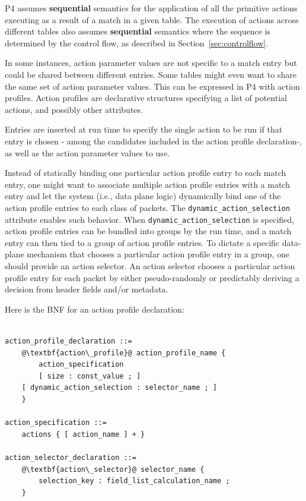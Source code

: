 \documentclass[12pt]{article}
\begin{document}
P4 assumes \textbf{sequential} semantics for the application of all the primitive actions 
executing as a result of a match in a given table. The execution of actions 
across different tables also assumes \textbf{sequential} semantics where the sequence is 
determined by the control flow, as described in Section~\ref{sec:controlflow}.


In some instances, action parameter values are not specific to a match entry but
could be shared between different entries. Some tables might even want to share
the same set of action parameter values. This can be expressed in P4 with
action profiles.
Action profiles are declarative structures specifying a list of potential
actions, and possibly other attributes.

Entries are inserted at run time to specify the single action to be run if that
entry is chosen - among the candidates included in the action profile
declaration-, as well as the action parameter values to use.

Instead of statically binding one particular action profile entry to each match
entry, one might want to associate multiple action profile entries with a match
entry and let the system (i.e., data plane logic) dynamically bind one of the
action profile entries to each class of packets. The
\texttt{dynamic_action_selection} attribute enables such behavior. When
\texttt{dynamic_action_selection} is specified, action profile entries can be
bundled into groups by the run time, and a match entry can then tied to a group
of action profile entries. To dictate a specific data-plane mechanism that
chooses a particular action profile entry in a group, one should provide an
action selector. An action selector chooses a particular action profile entry
for each packet by either pseudo-randomly or predictably deriving a decision
from header fields and/or metadata.

Here is the BNF for an action profile declaration:

\begin{lstlisting}[frame=single,backgroundcolor=\color{bnfgreen},escapechar=\@]

action_profile_declaration ::=
    @\textbf{action\_profile}@ action_profile_name {
        action_specification
        [ size : const_value ; ]
	[ dynamic_action_selection : selector_name ; ]
    }

action_specification ::= 
    actions { [ action_name ] + }

action_selector_declaration ::=
    @\textbf{action\_selector}@ selector_name {
        selection_key : field_list_calculation_name ;
    }

\end{lstlisting}
\end{document}
